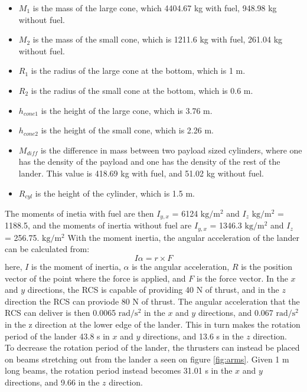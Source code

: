 \begin{itemize}
\item $M_1$ is the mass of the large cone, which 4404.67 kg with fuel, 948.98 kg without fuel.
\item $M_2$ is the mass of the small cone, which is 1211.6 kg with fuel, 261.04 kg without fuel.
\item $R_1$ is the radius of the large cone at the bottom, which is 1 m.
\item $R_2$ is the radius of the small cone at the bottom, which is 0.6 m.
\item $h_{cone1}$ is the height of the large cone, which is 3.76 m.
\item $h_{cone2}$ is the height of the small cone, which is 2.26 m.
\item $M_{diff}$ is the difference in mass between two payload sized cylinders, where one has the density of the payload and one has the density of the rest of the lander. This value is 418.69 kg with fuel, and 51.02 kg without fuel.
\item $R_{cyl}$ is the height of the cylinder, which is 1.5 m.
\end{itemize}

\noindent
The moments of inetia with fuel are then $I_{y,x}$ = 6124 $\mathrm{kg/m^2}$ and $I_{z}$ $\mathrm{kg/m^2}$ = 1188.5, and the moments of inertia without fuel are $I_{y,x}$ = 1346.3 $\mathrm{kg/m^2}$ and $I_{z}$ = 256.75. $\mathrm{kg/m^2}$ With the moment inertia, the angular acceleration of the lander can be calculated from:
\begin{equation}
    I \alpha = r \times F
\end{equation}
here, $I$ is the moment of inertia, $\alpha$ is the angular acceleration, $R$ is the position vector of the point where the force is applied, and $F$ is the force vector. In the $x$ and $y$ directions, the RCS is capable of providing 40 N of thrust, and in the $z$ direction the RCS can proviode 80 N of thrust. The angular acceleration that the RCS can deliver is then 0.0065 $\mathrm{rad/s^2}$ in the $x$ and $y$ directions, and 0.067 $\mathrm{rad/s^2}$ in the z direction at the lower edge of the lander. This in turn makes the rotation period of the lander 43.8 s in $x$ and $y$ directions, and 13.6 s in the $z$ direction.\\

\noindent
To decrease the rotation period of the lander, the thrusters can instead be placed on beams stretching out from the lander a seen on figure \ref{fig:arms}. Given 1 m long beams, the rotation period instead becomes 31.01 s in the $x$ and $y$ directions, and 9.66 in the $z$ direction.

